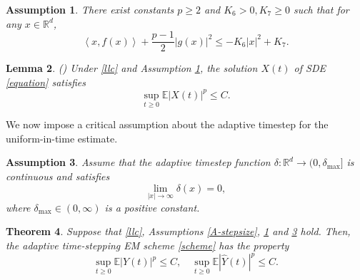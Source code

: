 \documentclass[preprint,12pt,compress]{elsarticle}
\newtheorem{theorem}{Theorem}[section] %
\newtheorem{lemma}[theorem]{Lemma}%
\newtheorem{assumption}[theorem]{Assumption}
\begin{document}
\begin{assumption}  \label{A4.1}
There exist constants $p \ge 2$ and ${K_6} >0,{K_7} \ge 0$ such that for any $x \in \mathbb{R}^d$,
\begin{equation*}
	\left\langle {x,f(x)} \right\rangle  + \frac{{p - 1}}{2}{\left| {g(x)} \right|^2} \le  - {K_6}{\left| x \right|^2} + {K_7}.
\end{equation*}
\end{assumption}

\begin{lemma} (\cite[Theorem 5.2]{li2019explicit})  \label{lemma-EXt0}
Under \eqref{llc} and Assumption \ref{A4.1}, the solution $X(t)$ of SDE \eqref{equation} satisfies
\begin{equation*}
	\mathop {\sup }\limits_{t \ge 0} \mathbb{E}{\left| {X(t)} \right|^p} \le C .
\end{equation*}
\end{lemma}

We now impose a critical assumption about the adaptive timestep for the uniform-in-time estimate.

\begin{assumption}  \label{A-stepbound}
	Assume that the adaptive timestep function $\delta: \mathbb{R}^d \to (0, \delta_{\max}]$ is continuous and satisfies
	\begin{equation*}
		\mathop {\lim }\limits_{|x| \to \infty } \delta (x) = 0, 
	\end{equation*}
 where $\delta_{\max} \in (0, \infty)$ is a positive constant.
\end{assumption}

\begin{theorem}  \label{th-bounded}
Suppose that \eqref{llc}, Assumptions \ref{A-stepsize}, \ref{A4.1} and \ref{A-stepbound} hold. Then, the adaptive time-stepping EM scheme \eqref{scheme} has the property
\begin{equation*} 
	 \mathop {\sup }\limits_{t \ge 0} \mathbb{E}{\left| {Y(t)} \right|^p} \le C,  \quad \mathop {\sup }\limits_{t \ge 0} \mathbb{E}{\left| {\hat Y(t)} \right|^p} \le C.
\end{equation*}
\end{theorem}
\end{document}

